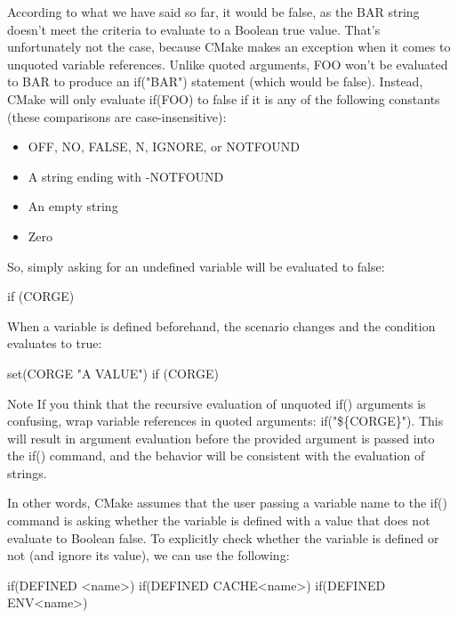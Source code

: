 According to what we have said so far, it would be false, as the BAR string doesn’t meet the criteria to evaluate to a Boolean true value. That’s unfortunately not the case, because CMake makes an exception when it comes to unquoted variable references. Unlike quoted arguments, FOO won’t be evaluated to BAR to produce an if("BAR") statement (which would be false). Instead, CMake will only evaluate if(FOO) to false if it is any of the following constants (these comparisons are case-insensitive):

\begin{itemize}
\item
OFF, NO, FALSE, N, IGNORE, or NOTFOUND

\item
A string ending with -NOTFOUND

\item
An empty string

\item
Zero
\end{itemize}

So, simply asking for an undefined variable will be evaluated to false:

\begin{cmake}
if (CORGE)
\end{cmake}

When a variable is defined beforehand, the scenario changes and the condition evaluates to true:

\begin{cmake}
set(CORGE "A VALUE")
if (CORGE)
\end{cmake}

\begin{myNotic}{Note}
If you think that the recursive evaluation of unquoted if() arguments is confusing, wrap variable references in quoted arguments: if("\$\{CORGE\}"). This will result in argument evaluation before the provided argument is passed into the if() command, and the behavior will be consistent with the evaluation of strings.
\end{myNotic}

In other words, CMake assumes that the user passing a variable name to the if() command is asking whether the variable is defined with a value that does not evaluate to Boolean false. To explicitly check whether the variable is defined or not (and ignore its value), we can use the following:

\begin{cmake}
if(DEFINED <name>)
if(DEFINED CACHE{<name>})
if(DEFINED ENV{<name>})
\end{cmake}

